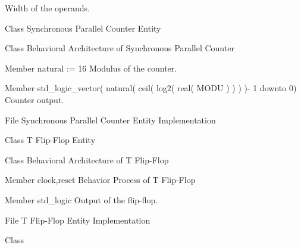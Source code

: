 \begin{DoxyRefList}
%
 Width of the operands.  
\item[Class \doxylink{classsync__par__counter}{sync\+\_\+par\+\_\+counter} ]\label{brief__brief000013}%
%
 Synchronous Parallel Counter Entity 
\item[Class \doxylink{classsync__par__counter_1_1behavioral}{sync\+\_\+par\+\_\+counter.behavioral} ]\label{brief__brief000016}%
%
 Behavioral Architecture of Synchronous Parallel Counter 
\item[Member \doxylink{classsync__par__counter_ad1fb3d73ae420e915d17d2d6526a8b38}{sync\+\_\+par\+\_\+counter.MODU} natural \+:= 16]\label{brief__brief000014}%
%
 Modulus of the counter.  
\item[Member \doxylink{classsync__par__counter_a8d41d53e3a519b0fa3bc795b56294a03}{sync\+\_\+par\+\_\+counter.q} std\+\_\+logic\+\_\+vector( natural( ceil( log2( real( MODU ) ) ) )-\/ 1 downto 0) ]\label{brief__brief000015}%
%
 Counter output.  
\item[File \doxylink{sync__par__counter_8vhdl}{sync\+\_\+par\+\_\+counter.vhdl} ]\label{brief__brief000012}%
%
 Synchronous Parallel Counter Entity Implementation 
\item[Class \doxylink{classt__flip__flop}{t\+\_\+flip\+\_\+flop} ]\label{brief__brief000018}%
%
 T Flip-\/\+Flop Entity 
\item[Class \doxylink{classt__flip__flop_1_1behavioral}{t\+\_\+flip\+\_\+flop.behavioral} ]\label{brief__brief000020}%
%
 Behavioral Architecture of T Flip-\/\+Flop 
\item[Member \doxylink{classt__flip__flop_1_1behavioral_a54bf197e3eeb676efeef9c4c9a251a35}{t\+\_\+flip\+\_\+flop.behavioral.behavior} clock,reset]\label{brief__brief000021}%
%
 Behavior Process of T Flip-\/\+Flop 
\item[Member \doxylink{classt__flip__flop_a9a2435598d86e246a9a61de35350938b}{t\+\_\+flip\+\_\+flop.q} std\+\_\+logic ]\label{brief__brief000019}%
%
 Output of the flip-\/flop.  
\item[File \doxylink{t__flip__flop_8vhdl}{t\+\_\+flip\+\_\+flop.vhdl} ]\label{brief__brief000017}%
%
 T Flip-\/\+Flop Entity Implementation 
\item[Class \doxylink{classuart}{uart} ]\label{brief__brief000059}%

\end{DoxyRefList}
